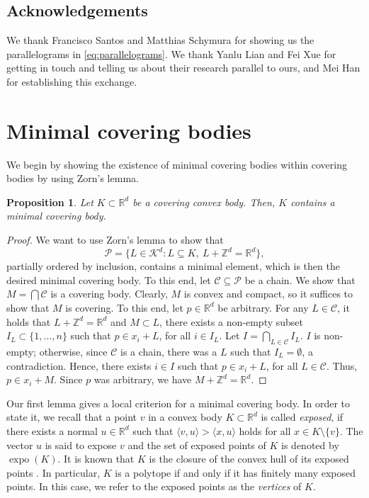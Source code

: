 \documentclass[11pt, a4paper]{amsart}
\newcommand{\RR}{\mathbb{R}}
\newcommand{\ZZ}{\mathbb{Z}}
\newcommand{\K}{\mathcal{K}}
\DeclareMathOperator{\expo}{expo}
\numberwithin{equation}{section}
\theoremstyle{plain}
\newtheorem{proposition}[theorem]{Proposition}
\begin{document}
\subsection*{Acknowledgements} 
We thank Francisco Santos and Matthias Schymura for showing us the parallelograms in \eqref{eq:parallelograms}. We thank Yanlu Lian and Fei Xue for getting in touch and telling us about their research parallel to ours, and Mei Han for establishing this exchange.


\section{Minimal covering bodies}
\label{sec:mumin}


We begin by showing the existence of minimal covering bodies within covering bodies by using Zorn's lemma.

\begin{proposition}
\label{prop:zorn}
    Let $K\subset\RR^d$ be a covering convex body. Then, $K$ contains a minimal covering body.
\end{proposition}

\begin{proof}
   We want to use Zorn's lemma to show that 
    \[
        \mathcal{P} = \{ L\in\K^d \colon L\subseteq K,~L+\ZZ^d = \RR^d\},  
    \]
    partially ordered by inclusion,
    contains a minimal element, which is then the desired minimal covering body. To this end, let $\mathcal{C}\subseteq\mathcal{P}$ be a chain. We show that $M=\bigcap\mathcal{C}$ is a covering body. Clearly, $M$ is convex and compact, so it suffices to show that $M$ is covering. To this end, let $p\in\RR^d$ be arbitrary. For any $L\in \mathcal{C}$, it holds that $L+\ZZ^d = \RR^d$ and $M\subset L$,  there exists a non-empty subset $I_L\subset \{1,\dots,n\}$ such that $p\in x_i+L$, for all $i\in I_L$. Let $I=\bigcap_{L\in\mathcal{C}} I_L$. $I$ is non-empty; otherwise, since $\mathcal C$ is a chain, there was a $L$ such that $I_L=\emptyset$, a contradiction. Hence, there exists $i\in I$ such that $p\in x_i + L$, for all $L\in\mathcal C$. Thus, $p\in x_i +M$. Since $p$ was arbitrary, we have $M+\ZZ^d = \RR^d$.
\end{proof}

Our first lemma gives a local criterion for a minimal covering body. In order to state it, we recall that a point $v$ in a convex body $K\subset\RR^d$ is called \emph{exposed}, if there exists a normal $u\in\RR^d$ such that $\langle v,u\rangle > \langle x, u\rangle$ holds for all $x\in K\setminus\{v\}$. The vector $u$ is said to expose $v$ and the set of exposed points of $K$ is denoted by $\expo(K)$. It is known that $K$ is the closure of the convex hull of its exposed points \cite[Theorem 1.4.7]{schneider}. In particular, $K$ is a polytope if and only if it has finitely many exposed points. In this case, we refer to the exposed points as the \emph{vertices} of $K$.
\end{document}
